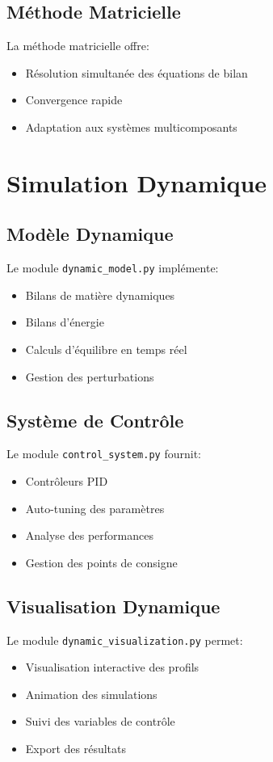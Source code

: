 \documentclass[12pt,a4paper]{report}
\begin{document}
\section{Méthode Matricielle}
La méthode matricielle offre:
\begin{itemize}
    \item Résolution simultanée des équations de bilan
    \item Convergence rapide
    \item Adaptation aux systèmes multicomposants
\end{itemize}

\chapter{Simulation Dynamique}
\section{Modèle Dynamique}
Le module \texttt{dynamic\_model.py} implémente:
\begin{itemize}
    \item Bilans de matière dynamiques
    \item Bilans d'énergie
    \item Calculs d'équilibre en temps réel
    \item Gestion des perturbations
\end{itemize}

\section{Système de Contrôle}
Le module \texttt{control\_system.py} fournit:
\begin{itemize}
    \item Contrôleurs PID
    \item Auto-tuning des paramètres
    \item Analyse des performances
    \item Gestion des points de consigne
\end{itemize}

\section{Visualisation Dynamique}
Le module \texttt{dynamic\_visualization.py} permet:
\begin{itemize}
    \item Visualisation interactive des profils
    \item Animation des simulations
    \item Suivi des variables de contrôle
    \item Export des résultats
\end{itemize}
\end{document}
